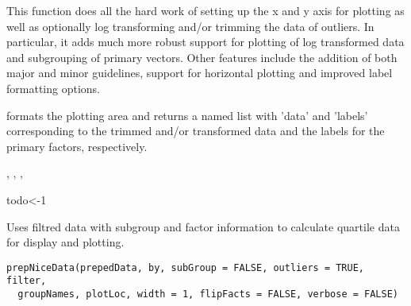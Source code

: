 \documentclass[a4paper]{book}
\begin{document}
%
\begin{Details}\relax
This function does all the hard work of setting up the x and y axis for plotting as well as optionally log transforming and/or trimming the data of outliers. In particular, it adds much more robust support for plotting of log transformed data and subgrouping of primary vectors. Other features include the addition of both major and minor guidelines, support for horizontal plotting and improved label formatting options.
\end{Details}
%
\begin{Value}
formats the plotting area and returns a named list with 'data' and 'labels' corresponding to the trimmed and/or transformed data and the labels for the primary factors, respectively.
\end{Value}
%
\begin{SeeAlso}\relax
{}, , , 
\end{SeeAlso}
%
\begin{Examples}
\begin{ExampleCode}
todo<-1

\end{ExampleCode}
\end{Examples}
%
\begin{Description}\relax
Uses filtred data with subgroup and factor information to calculate quartile data for display and plotting.
\end{Description}
%
\begin{Usage}
\begin{verbatim}
prepNiceData(prepedData, by, subGroup = FALSE, outliers = TRUE, filter,
  groupNames, plotLoc, width = 1, flipFacts = FALSE, verbose = FALSE)
\end{verbatim}
\end{Usage}
%
\end{document}
